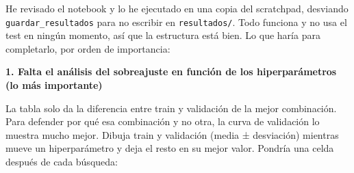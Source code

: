 \documentclass[11pt,a4paper]{article}
\begin{document}
{\small
He revisado el notebook y lo he ejecutado en una copia del scratchpad, desviando \texttt{guardar\_\allowbreak{}resultados} para no escribir en \texttt{resultados/\allowbreak{}}. Todo funciona y no usa el test en ningún momento, así que la estructura está bien. Lo que haría para completarlo, por orden de importancia:

\smallskip\noindent\textbf{1. Falta el análisis del sobreajuste en función de los hiperparámetros (lo más importante)}\par
La tabla solo da la diferencia entre train y validación de la mejor combinación. Para defender por qué esa combinación y no otra, la curva de validación lo muestra mucho mejor. Dibuja train y validación (media ± desviación) mientras mueve un hiperparámetro y deja el resto en su mejor valor. Pondría una celda después de cada búsqueda:

}
\end{document}
